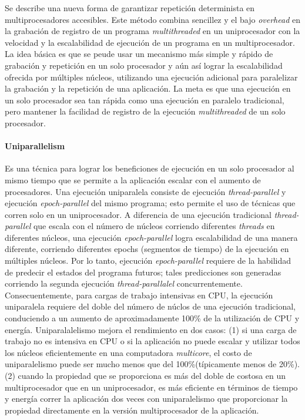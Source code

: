 Se describe una nueva forma de garantizar repetición determinista en multiprocesadores accesibles. Este método combina sencillez y el bajo \emph{overhead} en la grabación de registro de un programa \emph{multithreaded} en un uniprocesador con la velocidad y la escalabilidad de ejecución de un programa en un multiprocesador. La idea básica es que se peude usar un mecanismo más simple y rápido de grabación y repetición en un solo procesador y aún así lograr la escalabilidad ofrecida por múltiples núcleos, utilizando una ejecución adicional para paralelizar la grabación y la repetición de una aplicación. La meta es que una ejecución en un solo procesador sea tan rápida como una ejecución en paralelo tradicional, pero mantener la facilidad de registro de la ejecución \emph{multithreaded} de un solo procesador.

\paragraph{\textnormal{\textbf{Uniparallelism}}}
Es una técnica para lograr los beneficiones de ejecución en un solo procesador al mismo tiempo que se permite a la aplicación escalar con el aumento de procesadores. Una ejecución uniparalela consiste de ejecución \emph{thread-parallel} y ejecución \emph{epoch-parallel} del mismo programa; esto permite el uso de técnicas que corren solo en un uniprocesador. A diferencia de una ejecución tradicional \emph{thread-parallel} que escala con el número de núcleos corriendo diferentes \emph{threads} en diferentes núcleos, una ejecución \emph{epoch-parallel} logra escalabilidad de una manera diferente, corriendo diferentes epochs (segmentos de tiempo) de la ejecución en múltiples núcleos. Por lo tanto, ejecución \emph{epoch-parallel} requiere de la habilidad de predecir el estados del programa futuros; tales predicciones son generadas corriendo la segunda ejecución \emph{thread-parallalel} concurrentemente. Consecuentemente, para cargas de trabajo intensivas en CPU, la ejecución uniparalela requiere del doble del número de núclos de una ejecución tradicional, conduciendo a un aumento de aproximadamente 100\% de la utilización de CPU y energía. Uniparalalelismo mejora el rendimiento en dos casos: (1) si una carga de trabajo no es intensiva en CPU o si la aplicación no puede escalar y utilizar todos los núcleos eficientemente en una computadora \emph{multicore}, el costo de uniparalelismo puede ser mucho menos que del 100\%(típicamente menos de 20\%). (2) cuando la propiedad que se proporciona es más del doble de costosa en un multiprocesador que en un uniprocesador, es más eficiente en términos de tiempo y energía correr la aplicación dos veces con uniparalelismo que proporcionar la propiedad directamente en la versión multiprocesador de la aplicación.

